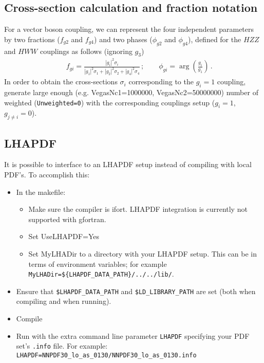 \documentclass[aps,superscriptaddress,nofootinbib]{revtex4}
\begin{document}
\subsection{Cross-section calculation and fraction notation}

For a vector boson coupling, we can represent the four independent parameters by two  fractions
($f_{g2}$ and $f_{g4}$) and two phases ($\phi_{g2}$ and $\phi_{g4}$), defined for the $HZZ$
and $HWW$ couplings as follows (ignoring $g_3$)
%
\begin{eqnarray}
&& f_{gi} =  \frac{|g^{}_{i}|^2\sigma_i}{|g^{}_{1}|^2\sigma_1+|g^{}_{2}|^2\sigma_2+|g^{}_{4}|^2\sigma_4}\,;
~~~~~~~~~
 \phi_{gi} = \arg\left(\frac{g_i}{g_1}\right)\,.
\nonumber
\label{eq:fractions}
\end{eqnarray}
%
In order to obtain the cross-sections $\sigma_i$ corresponding to the $g^{}_{i}=1$ coupling,
generate large enough (e.g. VegasNc1=1000000, VegasNc2=50000000) number of weighted
({\tt Unweighted=0}) with the corresponding couplings setup ($g^{}_{i}=1$, $g^{}_{j\ne i}=0$).

\subsection{LHAPDF}

It is possible to interface to an LHAPDF setup instead of compiling with local PDF's.  To accomplish this:

\begin{itemize}
\item In the makefile:
\begin{itemize}
\item Make sure the compiler is ifort.  LHAPDF integration is currently not supported with gfortran.
\item Set UseLHAPDF=Yes
\item Set MyLHADir to a directory with your LHAPDF setup.  This can be in terms of environment variables; for example \verb|MyLHADir=${LHAPDF_DATA_PATH}/../../lib/|.
\end{itemize}
\item Ensure that \verb|$LHAPDF_DATA_PATH| and \verb|$LD_LIBRARY_PATH| are set (both when compiling and when running).
\item Compile
\item Run with the extra command line parameter \verb|LHAPDF| specifying your PDF set's \verb|.info| file.  For example: \verb|LHAPDF=NNPDF30_lo_as_0130/NNPDF30_lo_as_0130.info|
\end{itemize}
\end{document}
